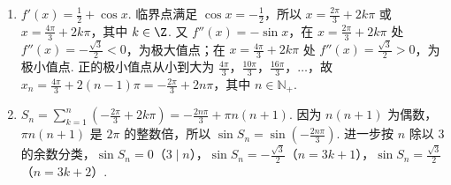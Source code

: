 \begin{solution}
\begin{enumerate}
\item \(f'(x)=\frac{1}{2}+\cos x\). 临界点满足 \(\cos x=-\frac{1}{2}\)，所以 \(x=\frac{2\pi}{3}+2k\pi\) 或 \(x=\frac{4\pi}{3}+2k\pi\)，其中 \(k\in\Z\). 又 \(f''(x)=-\sin x\)，在 \(x=\frac{2\pi}{3}+2k\pi\) 处 \(f''(x)=-\frac{\sqrt{3}}{2}<0\)，为极大值点；在 \(x=\frac{4\pi}{3}+2k\pi\) 处 \(f''(x)=\frac{\sqrt{3}}{2}>0\)，为极小值点. 正的极小值点从小到大为 \(\frac{4\pi}{3}\)，\(\frac{10\pi}{3}\)，\(\frac{16\pi}{3}\)，\(\ldots\)，故
\(x_n=\frac{4\pi}{3}+2(n-1)\pi=-\frac{2\pi}{3}+2n\pi\)，其中 \(n\in\mathbb N_{+}\).
\item \(S_n=\sum_{k=1}^n\left(-\frac{2\pi}{3}+2k\pi\right)=-\frac{2n\pi}{3}+\pi n(n+1)\). 因为 \(n(n+1)\) 为偶数，\(\pi n(n+1)\) 是 \(2\pi\) 的整数倍，所以 \(\sin S_n=\sin\left(-\frac{2n\pi}{3}\right)\). 进一步按 \(n\) 除以 \(3\) 的余数分类，\(\sin S_n=0\)（\(3\mid n\)），\(\sin S_n=-\frac{\sqrt{3}}{2}\)（\(n=3k+1\)），\(\sin S_n=\frac{\sqrt{3}}{2}\)（\(n=3k+2\)）.
\end{enumerate}
\end{solution}
